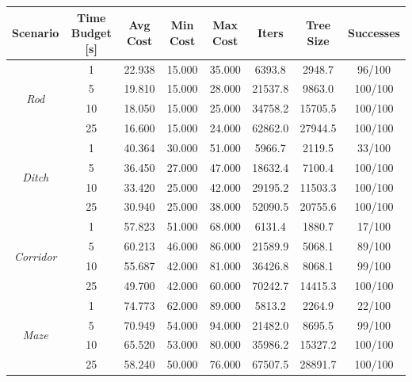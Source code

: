 \begin{table}
    \centering
    \begin{tabular}{*{8}{c}}
         Scenario & Time Budget [s] & Avg Cost & Min Cost & Max Cost & Iters & Tree Size & Successes \\
        \hline
        \multirow{4}{*}{\textit{Rod}} & 1 & 22.938 & 15.000 & 35.000 & 6393.8 & 2948.7 & 96/100 \\
         & 5 & 19.810 & 15.000 & 28.000 & 21537.8 & 9863.0 & 100/100 \\
         & 10 & 18.050 & 15.000 & 25.000 & 34758.2 & 15705.5 & 100/100 \\
         & 25 & 16.600 & 15.000 & 24.000 & 62862.0 & 27944.5 & 100/100 \\
        
        \hline                                                          
        \multirow{4}{*}{\textit{Ditch}} & 1 & 40.364 & 30.000 & 51.000 & 5966.7 & 2119.5 & 33/100 \\
         & 5 & 36.450 & 27.000 & 47.000 & 18632.4 & 7100.4 & 100/100 \\
         & 10 & 33.420 & 25.000 & 42.000 & 29195.2 & 11503.3 & 100/100 \\
         & 25 & 30.940 & 25.000 & 38.000 & 52090.5 & 20755.6 & 100/100 \\  
        
        \hline                                                            
        \multirow{4}{*}{\textit{Corridor}} & 1 & 57.823 & 51.000 & 68.000 & 6131.4 & 1880.7 & 17/100 \\
         & 5 & 60.213 & 46.000 & 86.000 & 21589.9 & 5068.1 & 89/100 \\
         & 10 & 55.687 & 42.000 & 81.000 & 36426.8 & 8068.1 & 99/100 \\
         & 25 & 49.700 & 42.000 & 60.000 & 70242.7 & 14415.3 & 100/100 \\    

        \hline                                                                      
        \multirow{4}{*}{\textit{Maze}} & 1 & 74.773 & 62.000 & 89.000 & 5813.2 & 2264.9 & 22/100 \\
         & 5 & 70.949 & 54.000 & 94.000 & 21482.0 & 8695.5 & 99/100 \\
         & 10 & 65.520 & 53.000 & 80.000 & 35986.2 & 15327.2 & 100/100 \\
         & 25 & 58.240 & 50.000 & 76.000 & 67507.5 & 28891.7 & 100/100 \\ 


\end{tabular}
\end{table}
